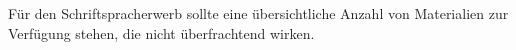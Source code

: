 Für den Schriftspracherwerb sollte eine übersichtliche Anzahl von Materialien zur Verfügung stehen, die nicht überfrachtend wirken.